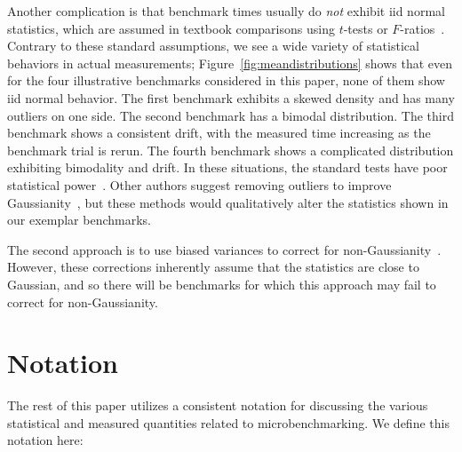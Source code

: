 \documentclass[conference]{IEEEtran}
\begin{document}
Another complication is that benchmark times usually do \textit{not} exhibit
iid normal statistics, which are assumed in textbook comparisons using
$t$-tests or $F$-ratios~\cite{Lilja2000}.
Contrary to these standard assumptions,
we see a wide variety of statistical behaviors in actual measurements;
Figure~\ref{fig:meandistributions} shows that even for the four illustrative
benchmarks considered in this paper, none of them show iid normal behavior.
The first benchmark exhibits a skewed density and has many outliers on one side.
The second benchmark has a bimodal distribution.
The third benchmark shows a consistent drift, with the measured time increasing
as the benchmark trial is rerun.
The fourth benchmark shows a complicated distribution exhibiting bimodality and
drift.
In these situations, the standard tests have poor statistical
power~\cite{Mytkowicz2009,Kalibera2013,Chen2015,Barrett2016}.
Other authors suggest removing outliers to improve
Gaussianity~\cite{Rehn2015}, but these methods would
qualitatively alter the statistics shown in our exemplar benchmarks.

The second approach is to use biased variances to correct for
non-Gaussianity~\cite{Mytkowicz2009}. However, these corrections
inherently assume that the statistics are close to Gaussian, and so there will be
benchmarks for which this approach may fail to correct for non-Gaussianity.


\label{sec:notation}
\section{Notation}

The rest of this paper utilizes a consistent notation for discussing the various statistical
and measured quantities related to microbenchmarking. We define this notation here:
\end{document}
